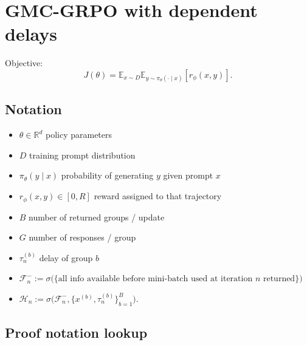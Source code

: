 \documentclass[10pt]{article}
\newcommand{\E}{\mathbb{E}}
\newcommand{\F}{\mathcal{F}}
\newcommand{\Hh}{\mathcal{H}}
\theoremstyle{preserved}
\begin{document}
\section*{GMC-GRPO with dependent delays}

Objective:
\begin{equation*}
J(\theta)=\E_{x\sim D}\E_{y\sim\pi_\theta(\cdot\mid x)}[r_\phi(x,y)].
\end{equation*}
\subsection*{Notation}
\begin{itemize}
\item $\theta\in\mathbb{R}^d$ policy parameters
\item $D$ training prompt distribution
\item $\pi_\theta(y\mid x)$ probability of generating $y$ given prompt $x$
\item $r_\phi(x,y)\in[0,R]$ reward assigned to that trajectory
\item $B$ number of returned groups / update
\item $G$ number of responses / group
\item $\tau_n^{(b)}$ delay of group $b$
\item $\F_n^-:=\sigma\bigl(\{\text{all info available before mini-batch used at iteration }n\text{ returned}\}\bigr)$
\item $\Hh_n:=\sigma\bigl(\F_n^-,\{x^{(b)},\tau_n^{(b)}\}_{b=1}^B\bigr).$
\end{itemize}

\subsection*{Proof notation lookup}
\end{document}
